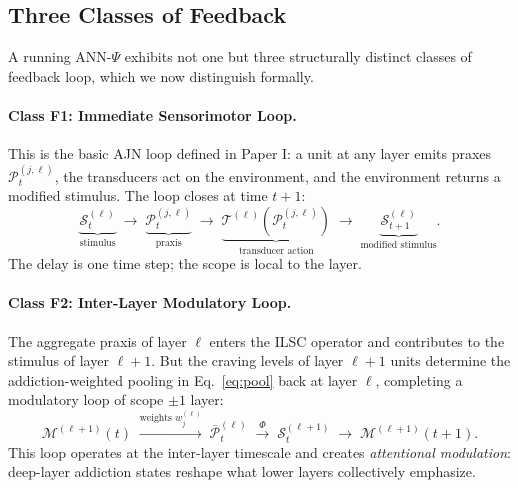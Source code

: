 \documentclass[12pt,a4paper]{article}
\newcommand{\tens}[1]{\boldsymbol{\mathcal{#1}}}
\begin{document}
\subsection{Three Classes of Feedback}

A running ANN-$\Psi$ exhibits not one but three structurally distinct classes of
feedback loop, which we now distinguish formally.

\paragraph{Class F1: Immediate Sensorimotor Loop.}
This is the basic AJN loop defined in Paper I: a unit at any layer emits praxes
$\tens{P}_t^{(j,\ell)}$, the transducers act on the environment, and the
environment returns a modified stimulus. The loop closes at time $t+1$:
\begin{equation}
\underbrace{\tens{S}_t^{(\ell)}}_{\text{stimulus}} \;\to\;
\underbrace{\tens{P}_t^{(j,\ell)}}_{\text{praxis}} \;\to\;
\underbrace{\mathcal{T}^{(\ell)}(\tens{P}_t^{(j,\ell)})}_{\text{transducer action}}
\;\to\; \underbrace{\tens{S}_{t+1}^{(\ell)}}_{\text{modified stimulus}}.
\label{eq:F1}
\end{equation}
The delay is one time step; the scope is local to the layer.

\paragraph{Class F2: Inter-Layer Modulatory Loop.}
The aggregate praxis of layer $\ell$ enters the ILSC operator and contributes to
the stimulus of layer $\ell+1$. But the craving levels of layer $\ell+1$ units
determine the addiction-weighted pooling in Eq.~\eqref{eq:pool} back at layer
$\ell$, completing a modulatory loop of scope $\pm 1$ layer:
\begin{equation}
\mathcal{M}^{(\ell+1)}(t)\; \xrightarrow{\text{weights } w_j^{(\ell)}} \;
\overline{\tens{P}}_t^{(\ell)} \;\xrightarrow{\Phi}\;
\tens{S}_t^{(\ell+1)} \;\to\;
\mathcal{M}^{(\ell+1)}(t+1).
\label{eq:F2}
\end{equation}
This loop operates at the inter-layer timescale and creates \textit{attentional
modulation}: deep-layer addiction states reshape what lower layers collectively
emphasize.
\end{document}
